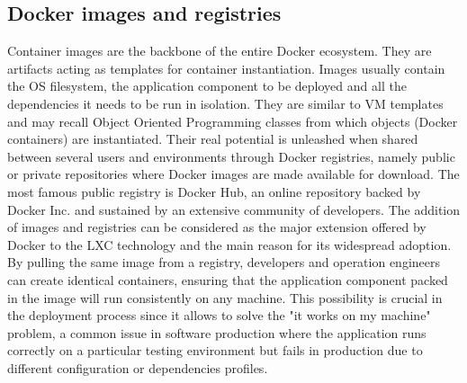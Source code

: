 \subsection{Docker images and registries}
Container images are the backbone of the entire Docker ecosystem. They are artifacts acting as templates for container instantiation. Images usually contain the OS filesystem, the application component to be deployed and all the dependencies it needs to be run in isolation. 
They are similar to VM templates and may recall Object Oriented Programming classes from which objects (Docker containers) are instantiated.
Their real potential is unleashed when shared between several users and environments through Docker registries, namely public or private repositories where Docker images are made available for download.
The most famous public registry is Docker Hub, an online repository backed by Docker Inc. and sustained by an extensive community of developers. 
The addition of images and registries can be considered as the major extension offered by Docker to the LXC technology and the main reason for its widespread adoption.
By pulling the same image from a registry, developers and operation engineers can create identical containers, ensuring that the application component packed in the image will run consistently on any machine.
This possibility is crucial in the deployment process since it allows to solve the "it works on my machine" problem, a common issue in software production where the application runs correctly on a particular testing environment but fails in production due to different configuration or dependencies profiles. 

